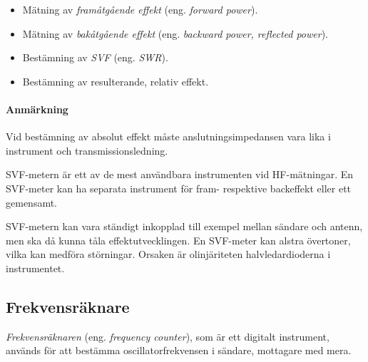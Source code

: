 \begin{itemize}
\item Mätning av \emph{framåtgående effekt} (eng. \emph{forward power}).
\item Mätning av \emph{bakåtgående effekt} (eng. \emph{backward power, reflected power}).
\item Bestämning av \emph{SVF} (eng. \emph{SWR}).
\item Bestämning av resulterande, relativ effekt.
\end{itemize}

\paragraph{Anmärkning} Vid bestämning av absolut effekt måste
anslutningsimpedansen vara lika i instrument och transmissionsledning.

SVF-metern är ett av de mest användbara instrumenten vid HF-mätningar.
En SVF-meter kan ha separata instrument för fram- respektive backeffekt eller
ett gemensamt.

SVF-metern kan vara ständigt inkopplad till exempel mellan sändare och antenn,
men ska då kunna tåla effektutvecklingen.
En SVF-meter kan alstra övertoner, vilka kan medföra störningar.
Orsaken är olinjäriteten halvledardioderna i instrumentet.

\subsection{Frekvensräknare}


\emph{Frekvensräknaren} (eng. \emph{frequency counter}), som är ett digitalt
instrument, används för att bestämma oscillatorfrekvensen i sändare,
mottagare med mera.

